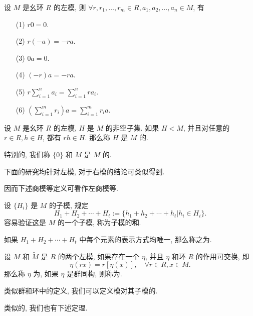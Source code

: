 \begin{proposition}
	设 $M$ 是幺环 $R$ 的左模, 则 $\forall r,r_1,\ldots,r_m\in R,a_1,a_2,\ldots,a_n\in M$, 有
	\begin{itemize}
		\item[(1)] $r0=0$.
		\item[(2)] $r(-a)=-ra$.
		\item[(3)] $0a=0$.
		\item[(4)] $(-r)a=-ra$.
		\item[(5)] $r\sum\limits_{i=1}^na_i=\sum\limits_{i=1}^n ra_i$.
		\item[(6)] $(\sum\limits_{i=1}^m r_i)a=\sum\limits_{i=1}^m r_ia$.
	\end{itemize}
\end{proposition}

\begin{definition}
	设 $M$ 是幺环 $R$ 的左模, $H$ 是 $M$ 的非空子集. 如果 $H<M$, 并且对任意的 $r\in R,h\in H$, 都有 $rh\in H$. 那么称 $H$ 是 $M$ 的.

	特别的, 我们称 $\{0\}$ 和 $M$ 是 $M$ 的.
\end{definition}

\begin{remark*}
	下面的研究均针对左模, 对于右模的结论可类似得到.
	
	因而下述商模等定义可看作左商模等.
\end{remark*}

\begin{definition}\label{子模的和}
	设 $\{H_i\}$ 是 $M$ 的子模, 规定 $$H_1+H_2+\cdots+H_t:=\{h_1+h_2+\cdots+h_t|h_i\in H_i\}.$$ 容易验证这是 $M$ 的一个子模, 称为子模的\textbf{和}.
	
	如果 $H_1+H_2+\cdots+H_t$ 中每个元素的表示方式均唯一, 那么称之为.
\end{definition}

\begin{definition}
	设 $M$ 和 $\widetilde{M}$ 是 $R$ 的两个左模, 如果存在一个 $\eta$, 并且 $\eta$ 和环 $R$ 的作用可交换, 即 $$\eta(rx)=r[\eta(x)],\quad \forall r\in R,x\in M.$$ 那么称 $\eta$ 为, 如果 $\eta$ 是群同构, 则称为.
\end{definition}

\begin{definition}
	类似群和环中的定义, 我们可以定义模对其子模的.
\end{definition}

类似的, 我们也有下述定理.

